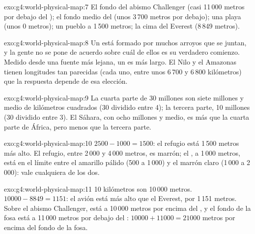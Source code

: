 \begin{solution}{exo:g4:world-physical-map:7}
El fondo del abismo Challenger (casi 11\,000 metros por debajo del ); el fondo medio del  (unos 3\,700 metros por debajo); una playa
(unos 0 metros); un pueblo a 1\,500 metros; la cima del Everest
(8\,849 metros).
\end{solution}

\begin{solution}{exo:g4:world-physical-map:8}
Un  está formado por muchos arroyos que se juntan, y la gente no se pone
de acuerdo sobre cuál de ellos es su verdadero comienzo. Medido desde una
fuente más lejana, un  es más largo. El Nilo y el Amazonas tienen
longitudes tan parecidas (cada uno, entre unos 6\,700 y 6\,800 kilómetros)
que la respuesta depende de esa elección.
\end{solution}

\begin{solution}{exo:g4:world-physical-map:9}
La cuarta parte de 30 millones son siete millones y medio de kilómetros
cuadrados (30 dividido entre 4); la tercera parte, 10 millones (30 dividido
entre 3). El Sáhara, con ocho millones y medio, es más que la cuarta parte
de África, pero menos que la tercera parte.
\end{solution}

\begin{solution}{exo:g4:world-physical-map:10}
$2500 - 1000 = 1500$: el refugio está 1\,500 metros más alto. El refugio,
entre 2\,000 y 4\,000 metros, es marrón; el , a 1\,000 metros, está en
el límite entre el amarillo pálido (500 a 1\,000) y el marrón claro
(1\,000 a 2\,000): vale cualquiera de los dos.
\end{solution}

\begin{solution}{exo:g4:world-physical-map:11}
10 kilómetros son 10\,000 metros. $10000 - 8849 = 1151$: el avión está más
alto que el Everest, por 1\,151 metros. Sobre el abismo Challenger, está a
10\,000 metros por encima del , y el fondo de la fosa está a
11\,000 metros por debajo del : $10000 + 11000 = 21000$ metros por
encima del fondo de la fosa.
\end{solution}
